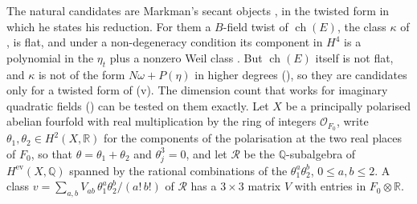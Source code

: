 \documentclass[11pt,reqno]{amsart}
\theoremstyle{plain}
\theoremstyle{definition}
\theoremstyle{remark}
\newcommand{\QQ}{\mathbb{Q}}
\newcommand{\RR}{\mathbb{R}}
\newcommand{\cO}{\mathcal{O}}
\DeclareMathOperator{\ch}{ch}
\begin{document}
The natural candidates are Markman's secant objects \cite{Mar25c}, in the
twisted form in which he states his reduction. For them a $B$-field twist of
$\ch(E)$, the class $\kappa$ of , is flat, and
under a non-degeneracy condition its component in $H^{4}$ is a polynomial in
the $\eta_{t}$ plus a nonzero Weil class
\cite[Proposition~10.2.1, Theorem~1.1.2]{Mar25c}. But $\ch(E)$ itself is not
flat, and $\kappa$ is not of the form $N\omega+P(\eta)$ in higher degrees
(), so they are candidates only for a twisted
form of (v). The dimension count that works for
imaginary quadratic fields () can be tested on them
exactly. Let $X$ be a principally polarised abelian fourfold with real
multiplication by the ring of integers $\cO_{F_{0}}$, write
$\theta_{1},\theta_{2}\in H^{2}(X,\RR)$ for the components of the
polarisation at the two real places of $F_{0}$, so that
$\theta=\theta_{1}+\theta_{2}$ and $\theta_{j}^{3}=0$, and let $\mathcal{R}$ be
the $\QQ$-subalgebra of $H^{\mathrm{ev}}(X,\QQ)$ spanned by the rational
combinations of the $\theta_{1}^{a}\theta_{2}^{b}$, $0\le a,b\le2$. A class
$v=\sum_{a,b}V_{ab}\,\theta_{1}^{a}\theta_{2}^{b}/(a!\,b!)$ of $\mathcal{R}$ has a
$3\times3$ matrix $V$ with entries in $F_{0}\otimes\RR$.
\end{document}
